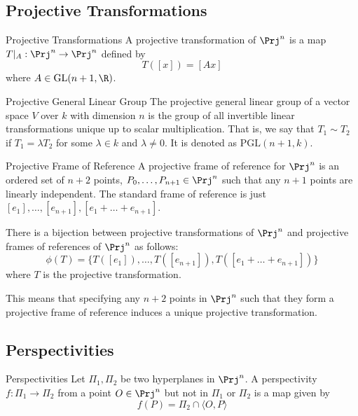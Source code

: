 \subsection{Projective Transformations}
\begin{defn}{Projective Transformations}{} A projective transformation of $\Prj^n$ is a map $T|_A:\Prj^n\to\Prj^n$ defined by $$T([x])=[Ax]$$ where $A\in\text{GL}(n+1,\R)$. 
\end{defn}

\begin{defn}{Projective General Linear Group}{} The projective general linear group of a vector space $V$ over $k$ with dimension $n$ is the group of all invertible linear transformations unique up to scalar multiplication. That is, we say that $T_1\sim T_2$ if $T_1=\lambda T_2$ for some $\lambda\in k$ and $\lambda\neq0$. It is denoted as $\text{PGL}(n+1,k)$. 
\end{defn}

\begin{defn}{Projective Frame of Reference}{} A projective frame of reference for $\Prj^n$ is an ordered set of $n+2$ points, $P_0,\dots,P_{n+1}\in\Prj^n$ such that any $n+1$ points are linearly independent. The standard frame of reference is just $[e_1],\dots,[e_{n+1}],[e_1+\dots+e_{n+1}]$. 
\end{defn}

\begin{prp}{}{} There is a bijection between projective transformations of $\Prj^n$ and projective frames of references of $\Prj^n$ as follows: $$\phi(T)=\{T([e_1]),\dots,T([e_{n+1}]),T([e_1+\dots+e_{n+1}])\}$$ where $T$ is the projective transformation. 
\end{prp}

This means that specifying any $n+2$ points in $\Prj^n$ such that they form a projective frame of reference induces a unique projective transformation. 

\subsection{Perspectivities}
\begin{defn}{Perspectivities}{} Let $\Pi_1,\Pi_2$ be two hyperplanes in $\Prj^n$. A perspectivity $f:\Pi_1\to\Pi_2$ from a point $O\in\Prj^n$ but not in $\Pi_1$ or $\Pi_2$ is a map given by $$f(P)=\Pi_2\cap\langle O,P\rangle$$
\end{defn}


